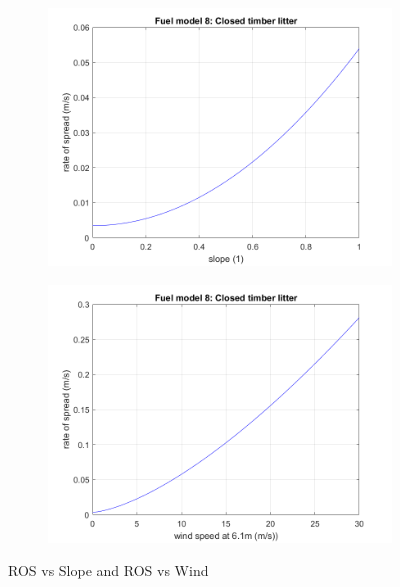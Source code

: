 \documentclass[11pt]{article}%
\begin{document}
\begin{figure}[ht]
    \centering
    \begin{subfigure}{0.45\textwidth}
        \centering
        \includegraphics[width=\linewidth]{images/fuel8_ros_slope.png}
    \end{subfigure}
    \hfill
    \begin{subfigure}{0.45\textwidth}
        \centering
        \includegraphics[width=\linewidth]{images/fuel8_ros_wind.png}
    \end{subfigure}
    \caption{ROS vs Slope and ROS vs Wind}
    \label{fig:ros_other}
\end{figure}
\end{document}
